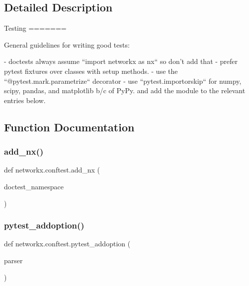 \subsection{Detailed Description}
\begin{DoxyVerb}Testing
=======

General guidelines for writing good tests:

- doctests always assume ``import networkx as nx`` so don't add that
- prefer pytest fixtures over classes with setup methods.
- use the ``@pytest.mark.parametrize``  decorator
- use ``pytest.importorskip`` for numpy, scipy, pandas, and matplotlib b/c of PyPy.
  and add the module to the relevant entries below.\end{DoxyVerb}
 

\subsection{Function Documentation}
\mbox{\label{namespacenetworkx_1_1conftest_a1b14c25037d76a454dfeffa29696f5bb}} 
\subsubsection{\texorpdfstring{add\+\_\+nx()}{add\_nx()}}
{\footnotesize\ttfamily def networkx.\+conftest.\+add\+\_\+nx (\begin{DoxyParamCaption}\item[{}]{doctest\+\_\+namespace }\end{DoxyParamCaption})}

\mbox{\label{namespacenetworkx_1_1conftest_aa489724b6e0b116191e1ccfa7afc5c8d}} 
\subsubsection{\texorpdfstring{pytest\+\_\+addoption()}{pytest\_addoption()}}
{\footnotesize\ttfamily def networkx.\+conftest.\+pytest\+\_\+addoption (\begin{DoxyParamCaption}\item[{}]{parser }\end{DoxyParamCaption})}

